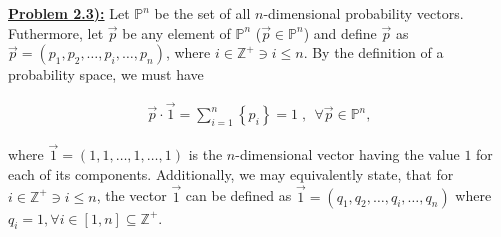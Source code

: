 \documentclass{article}[12pt]
\numberwithin{equation}{subsection}
\newcommand{\prob}[1]{\textbf{\underline{Problem #1):}}}
\begin{document}
\begin{flushleft}



\prob{2.3}  Let $\mathbb{P}^n$ be the set of all $n$-dimensional probability vectors.  Futhermore, let $\vec{p}$ be any element of $\mathbb{P}^n$ ($\vec{p} \in \mathbb{P}^n$) and define $\vec{p}$ as $\vec{p} = \left( p_1, p_2, \dots, p_i, \dots, p_n \right)$, where $i \in \mathbb{Z}^+ \ni i \leq n$.  By the definition of a probability space, we must have

\begin{align*}
\vec{p} \cdot \vec{1} = \sum_{i=1}^n \left\{ p_i \right\} = 1  \; , \; \, \forall \vec{p} \in \mathbb{P}^n,
\end{align*}

where $\vec{1} = \left( 1, 1, \dots, 1, \dots, 1 \right)$ is the $n$-dimensional vector having the value $1$ for each of its components.  Additionally, we may equivalently state, that for $i \in \mathbb{Z}^+ \ni i \leq n$, the vector $\vec{1}$ can be defined as $\vec{1} = \left( q_1, q_2, \dots, q_i, \dots, q_n \right)$ where $q_i = 1, \forall i \in [1, n] \subseteq \mathbb{Z}^+$. \newline


\end{flushleft}
\end{document}
